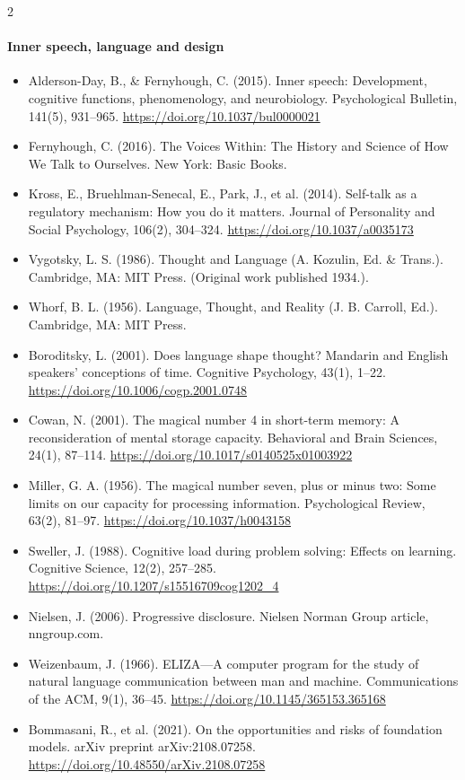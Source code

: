\documentclass[10pt]{article}
\theoremstyle{definition}
\theoremstyle{remark}
\begin{document}
\begin{multicols}{2}
\paragraph{Inner speech, language and design}
\begin{itemize}[leftmargin=1em,itemsep=0pt,topsep=1pt,parsep=0pt]
\item Alderson-Day, B., \& Fernyhough, C. (2015). Inner speech: Development, cognitive functions, phenomenology, and neurobiology. Psychological Bulletin, 141(5), 931--965. \url{https://doi.org/10.1037/bul0000021}
\item Fernyhough, C. (2016). The Voices Within: The History and Science of How We Talk to Ourselves. New York: Basic Books.
\item Kross, E., Bruehlman-Senecal, E., Park, J., et al. (2014). Self-talk as a regulatory mechanism: How you do it matters. Journal of Personality and Social Psychology, 106(2), 304--324. \url{https://doi.org/10.1037/a0035173}
\item Vygotsky, L. S. (1986). Thought and Language (A. Kozulin, Ed. \& Trans.). Cambridge, MA: MIT Press. (Original work published 1934.).
\item Whorf, B. L. (1956). Language, Thought, and Reality (J. B. Carroll, Ed.). Cambridge, MA: MIT Press.
\item Boroditsky, L. (2001). Does language shape thought? Mandarin and English speakers' conceptions of time. Cognitive Psychology, 43(1), 1--22. \url{https://doi.org/10.1006/cogp.2001.0748}
\item Cowan, N. (2001). The magical number 4 in short-term memory: A reconsideration of mental storage capacity. Behavioral and Brain Sciences, 24(1), 87--114. \url{https://doi.org/10.1017/s0140525x01003922}
\item Miller, G. A. (1956). The magical number seven, plus or minus two: Some limits on our capacity for processing information. Psychological Review, 63(2), 81--97. \url{https://doi.org/10.1037/h0043158}
\item Sweller, J. (1988). Cognitive load during problem solving: Effects on learning. Cognitive Science, 12(2), 257--285. \url{https://doi.org/10.1207/s15516709cog1202_4}
\item Nielsen, J. (2006). Progressive disclosure. Nielsen Norman Group article, nngroup.com.
\item Weizenbaum, J. (1966). ELIZA---A computer program for the study of natural language communication between man and machine. Communications of the ACM, 9(1), 36--45. \url{https://doi.org/10.1145/365153.365168}
\item Bommasani, R., et al. (2021). On the opportunities and risks of foundation models. arXiv preprint arXiv:2108.07258. \url{https://doi.org/10.48550/arXiv.2108.07258}
\end{itemize}

\end{multicols}
\end{document}
